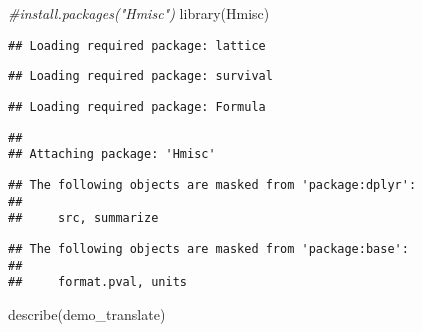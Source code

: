 \documentclass[
]{book}
\newenvironment{Shaded}{\begin{snugshade}}{\end{snugshade}}
\newcommand{\CommentTok}[1]{\textcolor[rgb]{0.56,0.35,0.01}{\textit{#1}}}
\newcommand{\FunctionTok}[1]{\textcolor[rgb]{0.00,0.00,0.00}{#1}}
\newcommand{\NormalTok}[1]{#1}
\begin{document}
\begin{Shaded}
\begin{Highlighting}[]
\CommentTok{\#install.packages("Hmisc")}
\FunctionTok{library}\NormalTok{(Hmisc)}
\end{Highlighting}
\end{Shaded}

\begin{verbatim}
## Loading required package: lattice
\end{verbatim}

\begin{verbatim}
## Loading required package: survival
\end{verbatim}

\begin{verbatim}
## Loading required package: Formula
\end{verbatim}

\begin{verbatim}
##
## Attaching package: 'Hmisc'
\end{verbatim}

\begin{verbatim}
## The following objects are masked from 'package:dplyr':
##
##     src, summarize
\end{verbatim}

\begin{verbatim}
## The following objects are masked from 'package:base':
##
##     format.pval, units
\end{verbatim}

\begin{Shaded}
\begin{Highlighting}[]
\FunctionTok{describe}\NormalTok{(demo\_translate)}
\end{Highlighting}
\end{Shaded}
\end{document}
